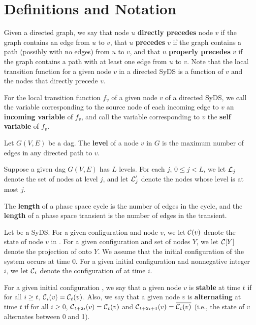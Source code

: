 \section{ Definitions and Notation}
\label{sec:defs}

Given a directed graph, we say that node $u$ {\bf directly precedes} node $v$ 
if the graph contains an edge from $u$ to $v$,
 that $u$ {\bf precedes} $v$ if the graph contains a path (possibly with no edges) from $u$ to $v$,
and that $u$ {\bf properly precedes} $v$
 if the graph contains a path with at least one edge  from $u$ to $v$.
Note that the local transition function for a given node $v$  in a directed SyDS is a function of $v$
 and the nodes that directly precede $v$.

\begin{definition}\label{def:variable_typesl}
For the local transition function $f_v$ of a given node $v$ of a directed  SyDS,
we call the variable corresponding to the source node 
of each incoming edge to $v$ an {\bf incoming variable} of $f_v$,
and call the variable corresponding to $v$ the  {\bf self variable} of $f_v$.
\end{definition}

\begin{definition}\label{def:dag_level}
Let $G(V,E)$ be a dag.
The \textbf{level} of a node $v$  in $G$ is the maximum number
of edges in any directed path to $v$.
\end{definition}

Suppose a given dag $G(V,E)$ has $L$ levels. 
For each $j$, $0 \leq j < L$, we let $\mbox{$\mathcal{L}$}_j$ denote the set of nodes at level $j$,
and let $\mbox{$\mathcal{L}$}_j'$ denote the nodes whose level is at most $j$.

The {\bf length} of a phase space cycle is the number of edges in the cycle,
and the {\bf length} of a phase space transient is the number of edges in the transient.

Let \cals{} be a SyDS.
For a given configuration \calc{} and node $v$,
we let $\mbox{$\mathcal{C}$}(v)$ denote the state of node $v$ in \calc{}.
For a given configuration \calc{} and set of nodes $Y$,
we let $\mbox{$\mathcal{C}$}[Y]$ denote the projection of \calc{} onto $Y$.
We assume that the initial configuration of the system 
occurs at time 0.
For a given initial configuration \calc{} and nonnegative integer $i$,
we let $\mbox{$\mathcal{C}$}_i$ denote the configuration of \cals{} at time $i$.

For a given initial configuration \calc{},
we  say that a given node $v$ is \textbf{stable} at time $t$ if
for all $i \geq t$, $\mbox{$\mathcal{C}$}_i(v)= \mbox{$\mathcal{C}$}_t(v)$.
Also, we say that a given node $v$ is \textbf{alternating} at time $t$ if
for all $i \geq 0$, 
$\mbox{$\mathcal{C}$}_{t+2i}(v) =  \mbox{$\mathcal{C}$}_t(v)$ 
and $\mbox{$\mathcal{C}$}_{t+2i+1}(v) = \overline{ \mbox{$\mathcal{C}$}_t(v)}$ 
(i.e., the state of $v$ alternates between 0 and 1).  

